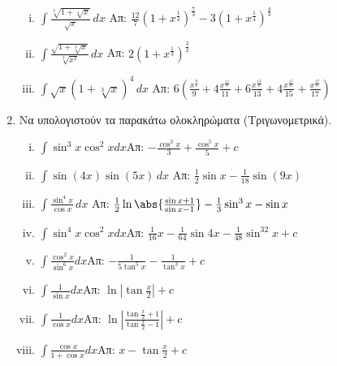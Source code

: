 \begin{enumerate}
		\begin{enumerate}[i)]
			\item $ \int \frac{\sqrt[3]{1+\sqrt[4]{x}}}{\sqrt{x}} \,{dx} $
				\hfill Απ: $ \frac{12}{7} \left(1+x^{\frac{1}{4}}\right)^{\frac{7}{3}} -
				3\left(1+x^{\frac{1}{4}}\right)^{\frac{4}{3}}$
			\item $ \int \frac{\sqrt{1+\sqrt[3]{x}}}{\sqrt[3]{x^{2}}} \,{dx} $
				\hfill Απ: $ 2\left(1+x^{\frac{1}{3}}\right)^{\frac{3}{2}} $
			\item $ \int \sqrt{x} \left(1+\sqrt[3]{x}\right)^{4} \,{dx} $ \hfill Απ: $
				6\left(\frac{x^{\frac{9}{6}}}{9} + 4 \frac{x^{\frac{11}{6}}}{11} + 6
				\frac{x^{\frac{13}{6}}}{13} + 4 \frac{x^{\frac{15}{6}}}{15} +
			\frac{x^{\frac{17}{6}}}{17}\right)$
		\end{enumerate}
	\item Να υπολογιστούν τα παρακάτω ολοκληρώματα (Τριγωνομετρικά).
	\begin{enumerate}[i)]
		\item  $\int\sin^3x\cos^2xdx$\hfill Απ: $-\frac{\cos^3x}{3}+\frac{\cos^5x}{5}+c$
		\item $ \int \sin{(4x)} \sin{(5x)} \,{dx} $ \hfill Απ: $ \frac{1}{2}
			\sin{x} - \frac{1}{18} \sin{(9x)}$
		\item $ \int \frac{\sin^{4}x}{\cos{x}} \,{dx} $ \hfill Απ: $
			\frac{1}{2}\ln{\abs{\frac{\sin{x} +1}{\sin{x} -1}}} -\frac{1}{3} \sin^{3}{x}
			- \sin{x}$
		\item  $\int\sin^4x\cos^2xdx$\hfill Απ: $\frac{1}{16}x-\frac{1}{64}\sin 4x-\frac{1}{48}\sin^32x+c$
		\item  $\int\frac{\cos^2x}{\sin^6x}dx$\hfill Απ: $-\frac{1}{5\tan^5x}-\frac{1}{\tan^3x}+c$
		\item  $\int\frac{1}{\sin x}dx$\hfill Απ:
			$\ln\left|\tan\frac{x}{2}\right|+c$
		\item  $\int\frac{1}{\cos x}dx$\hfill Απ:
			$\ln\left|\frac{\tan\frac{x}{2}+1}{\tan\frac{x}{2}-1}\right|+c$
		\item  $\int\frac{\cos x}{1+\cos x}dx$\hfill Απ: $x-\tan\frac{x}{2}+c$
\end{enumerate}
\end{enumerate}


